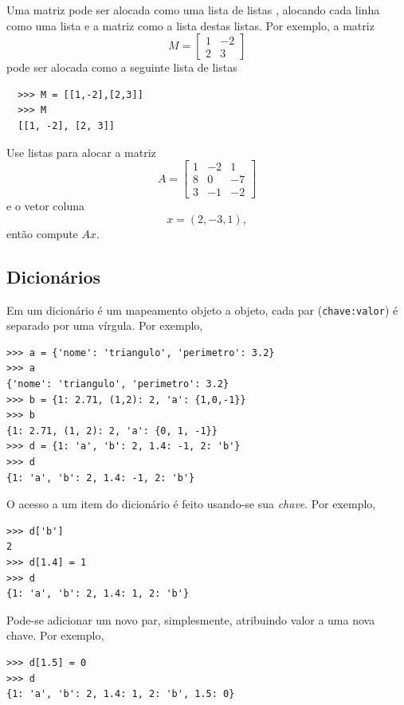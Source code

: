 \documentclass[12pt]{article}
\begin{document}
\begin{exr}
  Uma matriz pode ser alocada como uma lista de listas {\python}, alocando cada linha como uma lista e a matriz como a lista destas listas. Por exemplo, a matriz
  \begin{equation}
    M =
    \begin{bmatrix}
      1 & -2 \\
      2 & 3
    \end{bmatrix}
  \end{equation}
  pode ser alocada como a seguinte lista de listas
  \begin{lstlisting}
  >>> M = [[1,-2],[2,3]]
  >>> M
  [[1, -2], [2, 3]]
  \end{lstlisting}
  Use listas para alocar a matriz
  \begin{equation}
    A =
    \begin{bmatrix}
      1 & -2 & 1\\
      8 & 0 & -7\\
      3 & -1 & -2
    \end{bmatrix}
  \end{equation}
  e o vetor coluna
  \begin{equation}
    x = (2, -3, 1),
  \end{equation}
  então compute $Ax$.
\end{exr}

\subsection{Dicionários}

Em {\python} um dicionário é um mapeamento objeto a objeto, cada par (\verb+chave:valor+) é separado por uma vírgula. Por exemplo,
\begin{lstlisting}
>>> a = {'nome': 'triangulo', 'perimetro': 3.2}
>>> a
{'nome': 'triangulo', 'perimetro': 3.2}
>>> b = {1: 2.71, (1,2): 2, 'a': {1,0,-1}}
>>> b
{1: 2.71, (1, 2): 2, 'a': {0, 1, -1}}
>>> d = {1: 'a', 'b': 2, 1.4: -1, 2: 'b'}
>>> d
{1: 'a', 'b': 2, 1.4: -1, 2: 'b'}
\end{lstlisting}

O acesso a um item do dicionário é feito usando-se sua \emph{chave}. Por exemplo,
\begin{lstlisting}
>>> d['b']
2
>>> d[1.4] = 1
>>> d
{1: 'a', 'b': 2, 1.4: 1, 2: 'b'}
\end{lstlisting}
Pode-se adicionar um novo par, simplesmente, atribuindo valor a uma nova chave. Por exemplo,
\begin{lstlisting}
>>> d[1.5] = 0
>>> d
{1: 'a', 'b': 2, 1.4: 1, 2: 'b', 1.5: 0}
\end{lstlisting}
\end{document}
